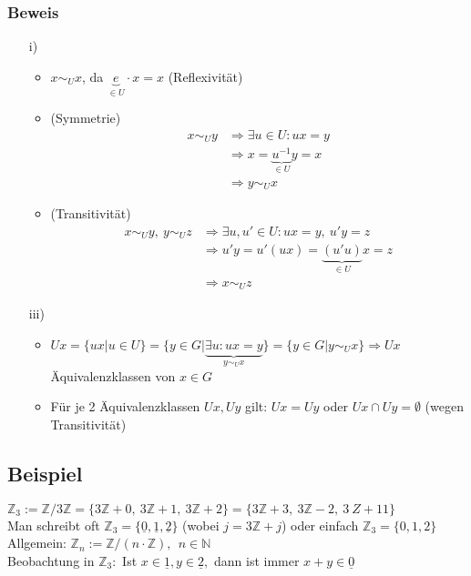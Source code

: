 \documentclass[12pt,titlepage, pdf]{article}
\newcommand{\Z}{\mathds{Z}}
\renewcommand{\>}{\rightarrow}
\renewcommand{\*}{\cdot}
\begin{document}
\subsubsection*{Beweis}
\begin{itemize}
	\item[i)]
	\begin{itemize}
		\item $x \sim_U x$, da $\underbrace{e}_{\in U} \cdot x = x$ (Reflexivität)
		\item (Symmetrie)\begin{align*}
			x \sim_U y &\Rightarrow \exists u \in U: ux = y\\
			 &\Rightarrow x = \underbrace{u^{-1}}_{\in U} y = x\\ &\Rightarrow y \sim_U x
		\end{align*} 
		\item  (Transitivität)\begin{align*}
			x \sim_U y,~ y \sim_U z &\Rightarrow \exists u,u' \in U: ux = y,~ u'y = z\\& \Rightarrow u'y = u'(ux) = \underbrace{(u'u)}_{\in U}x = z \\&\Rightarrow x \sim_U z
		\end{align*}
	\end{itemize}
	\item[iii)] 
	\begin{itemize} 
		\item$Ux = \{ux | u \in U \} = \{y \in G | \underbrace{\exists u : ux = y}_{y \sim_U x} \}= \{y \in G | y \sim_U x \} \Rightarrow Ux$ Äquivalenzklassen von $x  \in G$
		\item Für je 2 Äquivalenzklassen $Ux, Uy$ gilt: $Ux = Uy$ oder $ Ux \cap Uy = \emptyset$ (wegen Transitivität)
	\end{itemize} 
\end{itemize}
\subsection{Beispiel}
$\mathds{Z}_3 := \mathds{Z}/3\mathds{Z} = \{3\mathds{Z} + 0,~ 3\mathds{Z} + 1, ~3\mathds{Z}  +2\}=\{3\Z+3,~3\Z-2,~3\ Z+11\}$ \\
Man schreibt oft $\mathds{Z}_3 = \{\underline{0}, \underline{1},\underline{2}\}$ (wobei $j = 3\mathds{Z} +j$) oder einfach $\mathds{Z}_3 =\{0,1,2\}$\\
Allgemein: $\mathds{Z}_n := \mathds{Z}/(n \cdot \mathds{Z}),~~ n \in \mathds{N}$ \\
Beobachtung in $\mathds{Z}_3:$ Ist $x \in \underline{1}, y \in \underline{2},$ dann ist immer $x + y \in\underline{0}$
\end{document}
